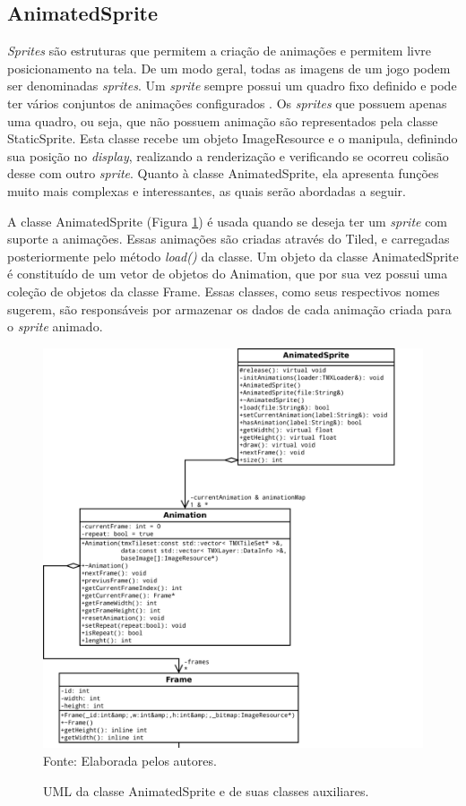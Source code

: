 \subsection{AnimatedSprite}
%
%
\textit{Sprites} são estruturas que permitem a criação de animações e permitem livre posicionamento na tela. De um modo geral, todas as imagens de um jogo podem ser denominadas \textit{sprites}. Um \textit{sprite} sempre possui um quadro fixo definido e pode ter vários conjuntos de animações configurados \cite{Novatec}. Os \textit{sprites} que possuem apenas uma quadro, ou seja, que não possuem animação são representados pela classe StaticSprite. Esta classe recebe um objeto ImageResource e o manipula, definindo sua posição no \textit{display}, realizando a renderização e verificando se ocorreu colisão desse com outro \textit{sprite}. Quanto à classe AnimatedSprite, ela apresenta funções muito mais complexas e interessantes, as quais serão abordadas a seguir.
\par 
A classe AnimatedSprite (Figura \ref{AnimatedSprite}) é usada quando se deseja ter um \textit{sprite} com suporte a animações. Essas animações são criadas através do Tiled, e carregadas posteriormente pelo método \textit{load()} da classe. Um objeto da classe AnimatedSprite é constituído de um vetor de objetos do Animation, que por sua vez possui uma coleção de objetos da classe Frame. Essas classes, como seus respectivos nomes sugerem, são responsáveis por armazenar os dados de cada animação criada para o \textit{sprite} animado.
%
%
%
\begin{figure}[H]
    \centering
    \caption{UML da classe AnimatedSprite e de suas classes auxiliares.}
    \label{AnimatedSprite}
    \includegraphics[scale = 0.40]{uml/AnimatedSprite.png}
    \\Fonte: Elaborada pelos autores.
\end{figure}
